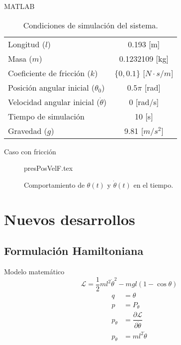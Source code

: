 \documentclass{beamer}
\begin{document}
\begin{frame}{MATLAB}
\begin{table}[hb]
 \begin{center}
\begin{tabular}{lc}
\hline
Longitud ($l$) & 0.193 [m] \\
Masa ($m$) & 0.1232109 [kg]\\
Coeficiente de fricción ($k$) & $\{0,0.1\}$ [$N \cdot s / m$] \\
Posición angular inicial ($\theta_0$) & $0.5\pi$ [rad] \\
Velocidad angular inicial ($\dot{\theta}$) & 0 [rad/s] \\
Tiempo de simulación & 10 [s]  \\
Gravedad ($g$) & 9.81 [$m/s^2$]  \\
\hline
 \end{tabular}
 \end{center}
 \caption{Condiciones de simulación del sistema.}
\label{table: simulation conditions}
\end{table}

\end{frame}

\begin{frame}{Caso con fricción}
\begin{figure}[hb!]
 \centering 
 {presPosVelF.tex}
 \caption{Comportamiento de $\theta(t)$ y $\dot{\theta}(t)$ en el tiempo.}
 \label{fig: time plot theta dtheta friction}
\end{figure}

\end{frame}

\section{Nuevos desarrollos}

\subsection{Formulación Hamiltoniana}
\begin{frame}{Modelo matemático}
 \begin{equation}
   \mathcal L = \dfrac{1}{2}m l^2 \dot{\theta}^2 - m g l (1 - \cos{\theta})
 \label{eq: pendulum lagrangian}
\end{equation}
\begin{subequations}
 \begin{align}
    q &= \theta \\
    p & = P_\theta\\
    p_\theta &= \dfrac{\partial \mathcal L}{\partial \dot \theta}\\
    p_\theta &= m l^2 \dot \theta 
 \end{align}
\end{subequations}
\end{frame}
\end{document}
